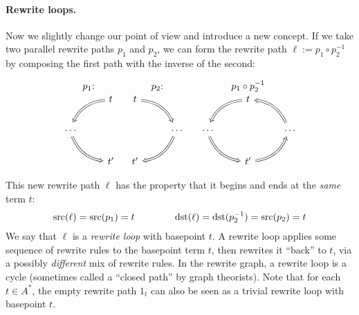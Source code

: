 \documentclass[../generics]{subfiles}
\begin{document}
\paragraph{Rewrite loops.}
Now we slightly change our point of view and introduce a new concept. If we take two parallel rewrite paths $p_1$ and $p_2$, we can form the rewrite path $\ell:=p_1\circ p_2^{-1}$ by composing the first path with the inverse of the second:
\begin{ceqn}
\[
\begin{array}{ccc}
\text{$p_1$:}&\text{$p_2$:}&\text{$p_1\circ p_2^{-1}$}\\
\begin{tikzcd}
&t\arrow[ld, Rightarrow, bend right]\\
\vphantom{P}\cdots\arrow[rd, Rightarrow, bend right]\\
&t^\prime
\end{tikzcd}&
\begin{tikzcd}
t\arrow[rd, Rightarrow, bend left]\\
&\vphantom{P}\cdots\arrow[ld, Rightarrow, bend left]\\
t^\prime
\end{tikzcd}&
\begin{tikzcd}
&t\arrow[ld, Rightarrow, bend right]\\
\vphantom{P}\cdots\arrow[rd, Rightarrow, bend right]&&\vphantom{P}\cdots\arrow[lu, Rightarrow, bend right]\\
&t^\prime\arrow[ru, Rightarrow, bend right]
\end{tikzcd}
\end{array}
\]
\end{ceqn}
This new rewrite path $\ell$ has the property that it begins and ends at the \emph{same} term $t$:
\begin{gather*}
\operatorname{src}(\ell)=\operatorname{src}(p_1)=t\qquad\qquad\operatorname{dst}(\ell)=\operatorname{dst}(p_2^{-1})=\operatorname{src}(p_2)=t
\end{gather*}
We say that $\ell$ is a \emph{rewrite loop} with basepoint $t$. A rewrite loop applies some sequence of rewrite rules to the basepoint term $t$, then rewrites it ``back'' to $t$, via a possibly \emph{different} mix of rewrite rules. In the rewrite graph, a rewrite loop is a cycle (sometimes called a ``closed path'' by graph theorists). Note that for each $t\in A^*$, the empty rewrite path $1_t$ can also be seen as a trivial rewrite loop with basepoint $t$.
\end{document}

